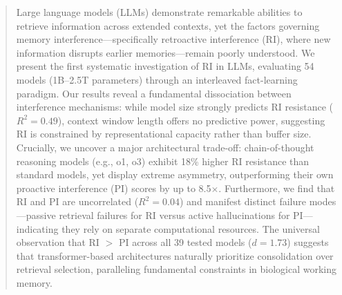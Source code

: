 \documentclass{article}
\begin{document}

\printAffiliationsAndNotice{}  %

\begin{abstract}
Large language models (LLMs) demonstrate remarkable abilities to retrieve information across extended contexts, yet the factors governing memory interference---specifically retroactive interference (RI), where new information disrupts earlier memories---remain poorly understood. We present the first systematic investigation of RI in LLMs, evaluating 54 models (1B--2.5T parameters) through an interleaved fact-learning paradigm. Our results reveal a fundamental dissociation between interference mechanisms: while model size strongly predicts RI resistance ($R^2 = 0.49$), context window length offers no predictive power, suggesting RI is constrained by representational capacity rather than buffer size. Crucially, we uncover a major architectural trade-off: chain-of-thought reasoning models (e.g., o1, o3) exhibit 18\% higher RI resistance than standard models, yet display extreme asymmetry, outperforming their own proactive interference (PI) scores by up to 8.5$\times$. Furthermore, we find that RI and PI are uncorrelated ($R^2 = 0.04$) and manifest distinct failure modes---passive retrieval failures for RI versus active hallucinations for PI---indicating they rely on separate computational resources. The universal observation that RI $>$ PI across all 39 tested models ($d = 1.73$) suggests that transformer-based architectures naturally prioritize consolidation over retrieval selection, paralleling fundamental constraints in biological working memory.
\end{abstract}
\end{document}
